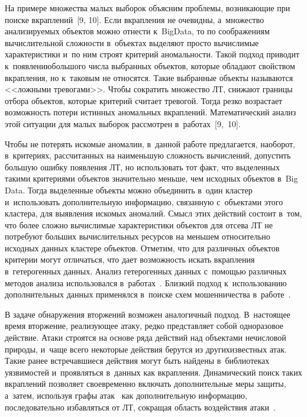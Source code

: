 \begin{multicols}{2}
  На примере множества малых выборок объясним проблемы, возникающие при 
поиске вкрап\-ле\-ний~[9, 10]. Если вкрапления не очевидны, а~множество 
анализируемых объектов можно от\-нес\-ти к~Big\linebreak Data, то по соображениям 
вы\-чис\-ли\-тель\-ной слож\-ности в~объектах выделяют просто вычислимые 
характеристики и~по ним строят критерий аномальности. Такой подход приводит 
к~появлению\linebreak \mbox{большого} числа выбранных объектов, которые обладают свойством 
вкрапления, но к~таковым не относятся. Такие выбранные объекты называются 
<<ложными тревогами>>. Чтобы сократить множество ЛТ, снижают границы 
отбора объектов, которые критерий считает тревогой. Тогда резко возрастает 
возможность потери истинных аномальных вкрап\-ле\-ний. Математический анализ 
этой ситуации для малых выборок рассмотрен в~работах~[9,~10]. 
  
  Чтобы не потерять искомые аномалии, в~данной работе предлагается, 
  наоборот, в~критериях, рассчитанных на наименьшую сложность вычислений, допустить 
большую ошибку появления ЛТ, но использовать тот факт, что выделенных 
такими критериями объектов значительно меньше, чем исходных объектов в~Big 
Data. Тогда выделенные объекты можно объединить в~один кластер 
и~использовать дополнительную информацию, связанную с~объектами этого 
кластера, для выявления искомых аномалий. Смысл этих действий состоит в~том, 
что более сложно вычислимые характеристики объектов для отсева 
ЛТ не потребуют больших вычислительных ресурсов на меньшем 
относительно исходных данных кластере объектов. Отметим, что для различных 
объектов критерии могут отличаться, что дает возможность искать вкрапления 
в~гетерогенных данных. Анализ гетерогенных данных с~помощью различных 
методов анализа использовался в~работах~\cite{4-grusho, 11-grusho}. Близкий 
подход к~использованию дополнительных данных применялся в~поиске схем 
мошенничества в~работе~\cite{8-grusho}. 
  
  В задаче обнаружения вторжений возможен аналогичный подход. В~настоящее 
время вторжение, реализующее атаку, редко представляет собой одноразовое 
действие. Атаки строятся на основе ряда действий над объектами нечисловой 
природы, и~чаще всего некоторые действия берутся из других\linebreak известных атак. 
Такие ранее встречавшиеся действия могут быть найдены в~библиотеках 
уязвимостей и~проявляться в~данных как вкрапления. Динамический поиск таких 
вкраплений позволяет \mbox{своевременно} включать дополнительные меры защиты, 
а~затем, используя графы атак~\cite{12-grusho} как дополнительную 
информацию, последовательно избавляться от ЛТ, сокращая область воздействия 
  атаки~\cite{2-grusho, 3-grusho, 13-grusho}.
  

\end{multicols}
